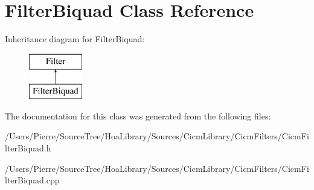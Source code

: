 \hypertarget{class_filter_biquad}{\section{Filter\-Biquad Class Reference}
\label{class_filter_biquad}
}
Inheritance diagram for Filter\-Biquad\-:\begin{figure}[H]
\begin{center}
\leavevmode
\includegraphics[height=2.000000cm]{class_filter_biquad}
\end{center}
\end{figure}


The documentation for this class was generated from the following files\-:\begin{DoxyCompactItemize}
\item 
/\-Users/\-Pierre/\-Source\-Tree/\-Hoa\-Library/\-Sources/\-Cicm\-Library/\-Cicm\-Filters/Cicm\-Filter\-Biquad.\-h\item 
/\-Users/\-Pierre/\-Source\-Tree/\-Hoa\-Library/\-Sources/\-Cicm\-Library/\-Cicm\-Filters/Cicm\-Filter\-Biquad.\-cpp\end{DoxyCompactItemize}

